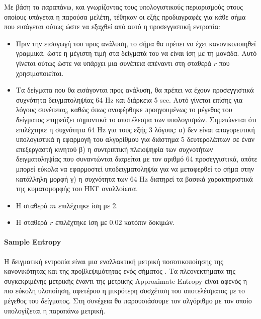 Με βάση τα παραπάνω, και γνωρίζοντας τους υπολογιστικούς περιορισμούς στους οποίους υπάγεται η παρούσα μελέτη, τέθηκαν οι εξής προδιαγραφές για κάθε σήμα που εισάγεται ούτως ώστε να εξαχθεί από αυτό η προσεγγιστική εντροπία:
\begin{itemize}
    \item Πριν την εισαγωγή του προς ανάλυση, το σήμα θα πρέπει να έχει κανονικοποιηθεί γραμμικά, ώστε η μέγιστη τιμή στα δείγματά του να είναι ίση με τη μονάδα. Αυτό γίνεται ούτως ώστε να υπάρχει μια συνέπεια απέναντι στη σταθερά $r$ που χρησιμοποιείται.
    \item Τα δείγματα που θα εισάγονται προς ανάλυση, θα πρέπει να έχουν προσεγγιστικά συχνότητα δειγματοληψίας 64 Hz και διάρκεια 5 sec. Αυτό γίνεται επίσης για λόγους συνέπειας, καθώς όπως αναφέρθηκε προηγουμένως το μέγεθος του δείγματος επηρεάζει σημαντικά το αποτέλεσμα των υπολογισμών. Σημειώνεται ότι επιλέχτηκε η συχνότητα 64 Hz για τους εξής 3 λόγους: α) δεν είναι απαγορευτική υπολογιστικά η εφαρμογή του αλγορίθμου για διάστημα 5 δευτερολέπτων σε έναν επεξεργαστή κινητού β) η συντριπτική πλειοψηφία των συχνοτήτων δειγματοληψίας που συναντώνται διαρείται με τον αριθμό 64 προσεγγιστικά, οπότε μπορεί εύκολα να εφαρμοστεί υποδειγματοληψία για να μεταφερθεί το σήμα στην κατάλληλη μορφή γ) η συχνότητα των 64 Hz διατηρεί τα βασικά χαρακτηριστικά της κυματομορφής του ΗΚΓ αναλλοίωτα.
    \item Η σταθερά $m$ επιλέχτηκε ίση με 2.
    \item Η σταθερά $r$ επιλέχτηκε ίση με 0.02 κατόπιν δοκιμών.
\end{itemize}

\paragraph{Sample Entropy}

Η δειγματική εντροπία είναι μια εναλλακτική μετρική ποσοτικοποίησης της κανονικότητας και της προβλεψιμότητας ενός σήματος \cite{wikiSampEn}. Τα πλεονεκτήματα της συγκεκριμένης μετρικής έναντι της μετρικής Approximate Entropy είναι αφενός η πιο εύκολη υλοποίηση, αφετέρου η μικρότερη συσχέτιση του αποτελέσματος με το μέγεθος του δείγματος. Στη συνέχεια θα παρουσιάσουμε τον αλγόριθμο με τον οποίο υπολογίζεται η παραπάνω μετρική.


